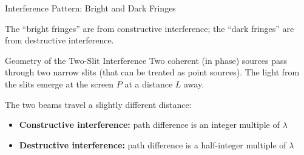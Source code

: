 \documentclass[12pt,compress,aspectratio=169]{beamer}
\begin{document}
\begin{frame}{Interference Pattern: Bright and Dark Fringes}
  \begin{center}
  \end{center}
  The ``bright fringes'' are from constructive interference; the ``dark
  fringes'' are from destructive interference.
\end{frame}



\begin{frame}{Geometry of the Two-Slit Interference}
  Two coherent (in phase) sources pass through two narrow slits (that can be
  treated as point sources). The light from the slits emerge at the screen $P$
  at a distance $L$ away.
  \begin{center}
  \end{center}
  \vspace{-.1in}The two beams travel a slightly different distance:
  \begin{itemize}
  \item\textbf{Constructive interference:} path difference is an integer
    multiple  of $\lambda$
  \item\textbf{Destructive interference:} path difference is a half-integer
    multiple  of $\lambda$
  \end{itemize}
\end{frame}
\end{document}
